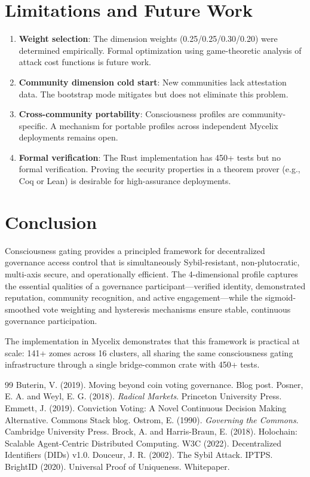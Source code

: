 \documentclass[11pt,twocolumn]{article}
\begin{document}
\section{Limitations and Future Work}

\begin{enumerate}
  \item \textbf{Weight selection}: The dimension weights (0.25/0.25/0.30/0.20)
    were determined empirically. Formal optimization using game-theoretic
    analysis of attack cost functions is future work.
  \item \textbf{Community dimension cold start}: New communities lack
    attestation data. The bootstrap mode mitigates but does not eliminate
    this problem.
  \item \textbf{Cross-community portability}: Consciousness profiles are
    community-specific. A mechanism for portable profiles across independent
    Mycelix deployments remains open.
  \item \textbf{Formal verification}: The Rust implementation has 450+ tests
    but no formal verification. Proving the security properties in a theorem
    prover (e.g., Coq or Lean) is desirable for high-assurance deployments.
\end{enumerate}

\section{Conclusion}

Consciousness gating provides a principled framework for decentralized governance
access control that is simultaneously Sybil-resistant, non-plutocratic,
multi-axis secure, and operationally efficient. The 4-dimensional profile
captures the essential qualities of a governance participant---verified identity,
demonstrated reputation, community recognition, and active engagement---while
the sigmoid-smoothed vote weighting and hysteresis mechanisms ensure stable,
continuous governance participation.

The implementation in Mycelix demonstrates that this framework is practical at
scale: 141+ zomes across 16 clusters, all sharing the same consciousness
gating infrastructure through a single bridge-common crate with 450+ tests.

\begin{thebibliography}{99}
   Buterin, V. (2019). Moving beyond coin voting governance.
    Blog post.
   Posner, E. A. and Weyl, E. G. (2018). \textit{Radical Markets}.
    Princeton University Press.
   Emmett, J. (2019). Conviction Voting: A Novel
    Continuous Decision Making Alternative. Commons Stack blog.
   Ostrom, E. (1990). \textit{Governing the Commons}.
    Cambridge University Press.
   Brock, A. and Harris-Braun, E. (2018). Holochain:
    Scalable Agent-Centric Distributed Computing.
   W3C (2022). Decentralized Identifiers (DIDs) v1.0.
   Douceur, J. R. (2002). The Sybil Attack. IPTPS.
   BrightID (2020). Universal Proof of Uniqueness. Whitepaper.
\end{thebibliography}
\end{document}
